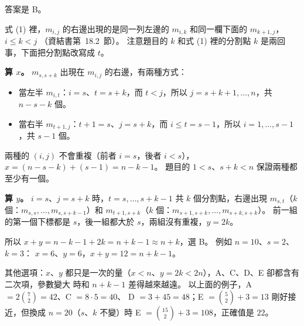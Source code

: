 \begin{pastsoln}
答案是 B。

式 (1) 裡，$m_{i,j}$ 的右邊出現的是同一列左邊的 $m_{i,k}$ 和同一欄下面的 $m_{k+1,j}$，$i \le k < j$
（資結書第~18.2~節）。 注意題目的 $k$ 和式 (1) 裡的分割點 $k$ 是兩回事，下面把分割點改寫成 $t$。

\textbf{算 $x$。} $m_{s,s+k}$ 出現在 $m_{i,j}$ 的右邊，有兩種方式：
\begin{itemize}
\item 當左半 $m_{i,t}$：$i = s$、$t = s + k$，而 $t < j$，所以 $j = s + k + 1, \ldots, n$，共 $n - s - k$ 個。
\item 當右半 $m_{t+1,j}$：$t + 1 = s$、$j = s + k$，而 $i \le t = s - 1$，所以 $i = 1, \ldots, s - 1$，共
$s - 1$ 個。
\end{itemize}
兩種的 $(i, j)$ 不會重複（前者 $i = s$，後者 $i < s$），$x = (n - s - k) + (s - 1) = n - k - 1$。 題目的
$1 < s$、$s + k < n$ 保證兩種都至少有一個。

\textbf{算 $y$。} $i = s$、$j = s + k$ 時，$t = s, \ldots, s + k - 1$ 共 $k$ 個分割點，右邊出現
$m_{s,t}$（$k$ 個：$m_{s,s}, \ldots, m_{s,s+k-1}$）和 $m_{t+1,s+k}$（$k$ 個：$m_{s+1,s+k}, \ldots,
m_{s+k,s+k}$）。 前一組的第一個下標都是 $s$，後一組都大於 $s$，兩組沒有重複，$y = 2k$。

所以 $x + y = n - k - 1 + 2k = n + k - 1 \approx n + k$，選 B。 例如 $n = 10$、$s = 2$、$k = 3$：
$x = 6$、$y = 6$，$x + y = 12 = n + k - 1$。

其他選項：$x$、$y$ 都只是一次的量（$x < n$、$y = 2k < 2n$），A、C、D、E 卻都含有二次項，參數變大
時和 $n + k - 1$ 差得越來越遠。 以上面的例子，A $= 2\binom{7}{2} = 42$、C $= 8 \cdot 5 = 40$、
D $= 3 + 45 = 48$；E $= \binom{5}{2} + 3 = 13$ 剛好接近，但換成 $n = 20$（$s$、$k$ 不變）時
E $= \binom{15}{2} + 3 = 108$，正確值是 $22$。
\end{pastsoln}
